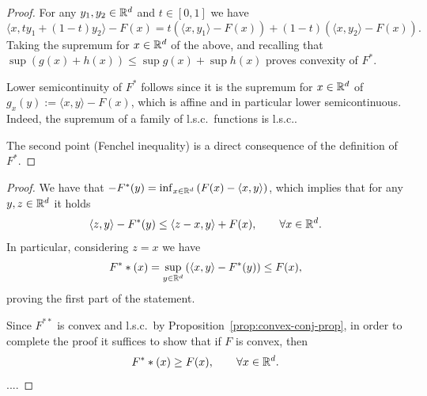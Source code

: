 \documentclass{report}
\begin{document}
\begin{proof}
	For any $y_1,y_2\in\mathbb{R}^d$ and $t\in[0,1]$ we have
	\begin{equation}
		\langle x, ty_1+(1-t)y_2 \rangle-F(x) = 
		t \left(\langle x, y_1\rangle-F(x)\right) + (1-t) \left(\langle x, y_2\rangle-F(x)\right).
	\end{equation}
	Taking the supremum for $x\in\mathbb{R}^d$ of the above, and recalling that $\sup(g(x)+h(x))\le \sup g(x)+\sup h(x)$ proves convexity of $F^*$. 

	Lower semicontinuity of $F^*$ follows since it is the supremum for $x\in\mathbb{R}^d$ of $g_x(y):=\langle x,y\rangle -F(x)$, which is affine and in particular lower semicontinuous. Indeed, the supremum of a family of l.s.c.~functions is l.s.c..

	The second point (Fenchel inequality) is a direct consequence of the definition of $F^*$.
\end{proof}


\begin{proof}
	We have that $-F^*(y)=\inf_{x\in\mathbb{R}^d} \left(F(x)-\langle x,y\rangle\right)$, which implies that for any $y,z\in\mathbb{R}^d$ it holds 
	\begin{equation}
		\langle z,y\rangle - F^*(y) \le \langle z-x,y\rangle +F(x), \qquad \forall x\in\mathbb{R}^d.
	\end{equation}
	In particular, considering $z=x$ we have 
	\begin{equation}
		F^**(x) = \sup_{y\in\mathbb{R}^d} \left(\langle x,y\rangle - F^*(y)\right) \le F(x),
	\end{equation}
	proving the first part of the statement.
	
	Since $F^{**}$ is convex and l.s.c.~by Proposition~\ref{prop:convex-conj-prop}, in order to complete the proof it suffices to show that if $F$ is convex, then 
	\begin{equation}
		F^**(x)\ge F(x),\qquad \forall x\in\mathbb{R}^d.
	\end{equation}
	....
\end{proof}
\end{document}
